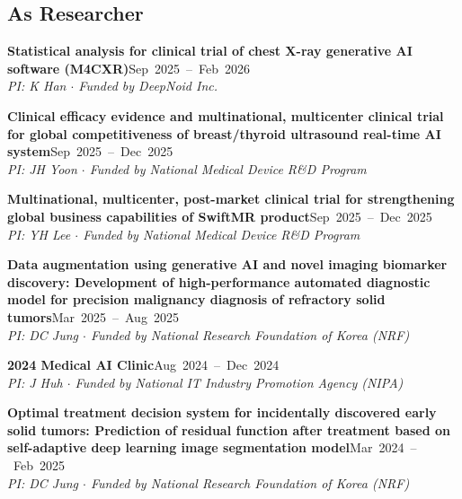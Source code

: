 \documentclass[10pt,a4paper]{article}
\newenvironment{projlist}{%
    \renewcommand{\labelenumi}{\color{headercolor}[\theenumi]}%
    \begin{etaremune}[leftmargin=2em, itemsep=0.3em]%
}{\end{etaremune}}
\begin{document}
\subsection*{As Researcher}
\begin{projlist}
    \item \textbf{Statistical analysis for clinical trial of chest X-ray generative AI software (M4CXR)}\hfill{}\hspace*{\fill}\mbox{Sep 2025 -- Feb 2026}\\
    \textit{PI: K Han $\cdot$ Funded by DeepNoid Inc.}

    \item \textbf{Clinical efficacy evidence and multinational, multicenter clinical trial for global competitiveness of breast/thyroid ultrasound real-time AI system}\hfill{}\hspace*{\fill}\mbox{Sep 2025 -- Dec 2025}\\
    \textit{PI: JH Yoon $\cdot$ Funded by National Medical Device R\&D Program}

    \item \textbf{Multinational, multicenter, post-market clinical trial for strengthening global business capabilities of SwiftMR product}\hfill{}\hspace*{\fill}\mbox{Sep 2025 -- Dec 2025}\\
    \textit{PI: YH Lee $\cdot$ Funded by National Medical Device R\&D Program}

    \item \textbf{Data augmentation using generative AI and novel imaging biomarker discovery: Development of high-performance automated diagnostic model for precision malignancy diagnosis of refractory solid tumors}\hfill{}\hspace*{\fill}\mbox{Mar 2025 -- Aug 2025}\\
    \textit{PI: DC Jung $\cdot$ Funded by National Research Foundation of Korea (NRF)}

    \item \textbf{2024 Medical AI Clinic}\hfill{}\hspace*{\fill}\mbox{Aug 2024 -- Dec 2024}\\
    \textit{PI: J Huh $\cdot$ Funded by National IT Industry Promotion Agency (NIPA)}

    \item \textbf{Optimal treatment decision system for incidentally discovered early solid tumors: Prediction of residual function after treatment based on self-adaptive deep learning image segmentation model}\hfill{}\hspace*{\fill}\mbox{Mar 2024 -- Feb 2025}\\
    \textit{PI: DC Jung $\cdot$ Funded by National Research Foundation of Korea (NRF)}


\end{projlist}
\end{document}
